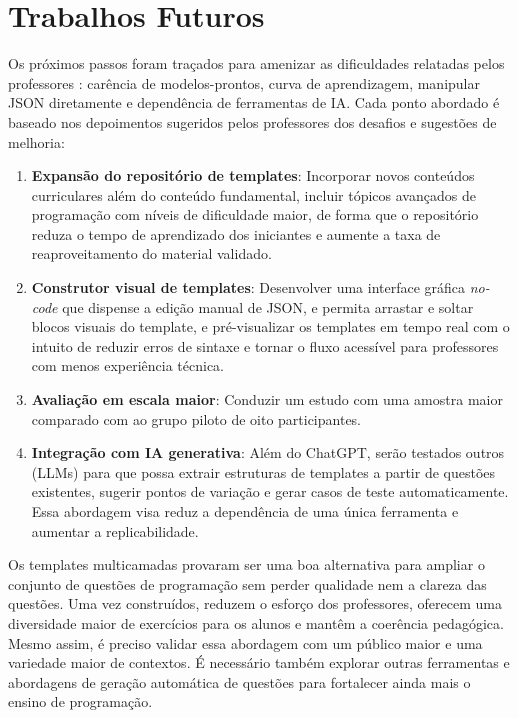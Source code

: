 \section{Trabalhos Futuros}

Os próximos passos foram traçados para amenizar as dificuldades relatadas pelos professores : carência de modelos-prontos, curva de aprendizagem, manipular JSON diretamente e dependência de ferramentas de IA. Cada ponto abordado é baseado nos depoimentos sugeridos pelos professores dos desafios e sugestões de melhoria:

\begin{enumerate}
  \item \textbf{Expansão do repositório de templates}: Incorporar novos conteúdos curriculares além do conteúdo fundamental, incluir tópicos avançados de programação com níveis de dificuldade maior, de forma que o repositório reduza o tempo de aprendizado dos iniciantes e aumente a taxa de reaproveitamento do material validado.
  \item \textbf{Construtor visual de templates}: Desenvolver uma interface gráfica \emph{no-code} que dispense a edição manual de JSON, e permita arrastar e soltar blocos visuais do template, e pré-visualizar os templates em tempo real com o intuito de reduzir erros de sintaxe e tornar o fluxo acessível para professores com menos experiência técnica.
  \item \textbf{Avaliação em escala maior}: Conduzir um estudo com uma amostra maior comparado com ao grupo piloto de oito participantes.
  \item \textbf{Integração com IA generativa}:
  Além do ChatGPT, serão testados outros (LLMs) para que possa extrair estruturas de templates a partir de questões existentes, sugerir pontos de variação e gerar casos de teste automaticamente. Essa abordagem visa reduz a dependência de uma única ferramenta e aumentar a replicabilidade.
\end{enumerate}

Os templates multicamadas provaram ser uma boa alternativa para ampliar o conjunto de questões de programação sem perder qualidade nem a clareza das questões. Uma vez construídos, reduzem o esforço dos professores, oferecem uma diversidade maior de exercícios para os alunos e mantêm a coerência pedagógica. Mesmo assim, é preciso validar essa abordagem com um público maior e uma variedade maior de contextos. É necessário também explorar outras ferramentas e abordagens de geração automática de questões para fortalecer ainda mais o ensino de programação.